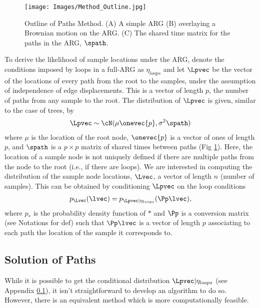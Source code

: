 \begin{figure}[h]
    \centering
    \texttt{[image: Images/Method\_Outline.jpg]}
    \caption{Outline of Paths Method. (A) A simple ARG (B) overlaying a Brownian motion on the ARG. (C) The shared time matrix for the paths in the ARG, $\spath$. }
    \label{fig:Method}
\end{figure}

To derive the likelihood of sample locations under the ARG, denote the conditions imposed by loops in a full-ARG as $\eta_{loops}$ and let $\Lpvec$ be the vector of the locations of every path from the root to the samples, under the assumption of independence of edge displacements. This is a vector of length $p$, the number of paths from any sample to the root. The distribution of $\Lpvec$ is given, similar to the case of trees, by
\begin{eqnarray}
\Lpvec \sim \cN(\mu \onevec{p},\sigma^2 \spath )
\end{eqnarray}
where $\mu$ is the location of the root node, $\onevec{p}$ is a vector of ones of length $p$, and $\spath$ is a $p\times p$ matrix of shared times between paths (Fig \ref{fig:Method}). Here, the location of a sample node is not uniquely defined if there are multiple paths from the node to the root (i.e., if there are loops). We are interested in computing the distribution of the sample node locations, $\Lvec$, a vector of length $n$ (number of samples). This can be obtained by conditioning $\Lpvec$ on the loop conditions 
\begin{eqnarray}
    p_{\Lvec} (\lvec) = p_{\Lpvec | \eta_{loops}}(\Pp\lvec),
\end{eqnarray}
where $p_*$ is the probability density function of $*$ and $\Pp$ is a conversion matrix (see Notations for def) such that $\Pp \lvec$ is a vector of length $p$ associating to each path the location of the sample it corresponds to. 

\subsection{Solution of Paths}

While it is possible to get the conditional distribution $\Lpvec | \eta_{loops}$ (see Appendix \ref{}), it isn't straightforward to develop an algorithm to do so. However, there is an equivalent method which is more computationally feasible.

